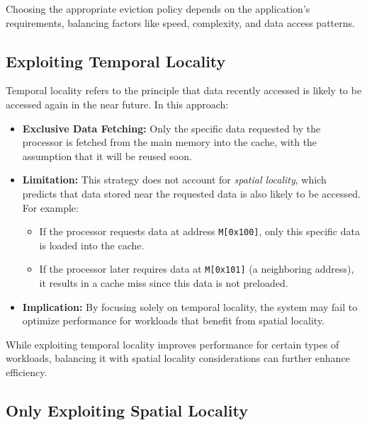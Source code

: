 Choosing the appropriate eviction policy depends on the application's requirements, balancing factors like speed, complexity, and data access patterns.

\subsection{Exploiting Temporal Locality}
Temporal locality refers to the principle that data recently accessed is likely to be accessed again in the near future. In this approach:

\begin{itemize}
    \item \textbf{Exclusive Data Fetching:} Only the specific data requested by the processor is fetched from the main memory into the cache, with the assumption that it will be reused soon.
    
    \item \textbf{Limitation:} This strategy does not account for \textit{spatial locality}, which predicts that data stored near the requested data is also likely to be accessed. For example:
    \begin{itemize}
        \item If the processor requests data at address \texttt{M[0x100]}, only this specific data is loaded into the cache.
        \item If the processor later requires data at \texttt{M[0x101]} (a neighboring address), it results in a cache miss since this data is not preloaded.
    \end{itemize}
    
    \item \textbf{Implication:} By focusing solely on temporal locality, the system may fail to optimize performance for workloads that benefit from spatial locality.
\end{itemize}

While exploiting temporal locality improves performance for certain types of workloads, balancing it with spatial locality considerations can further enhance efficiency.

\subsection{Only Exploiting Spatial Locality}
